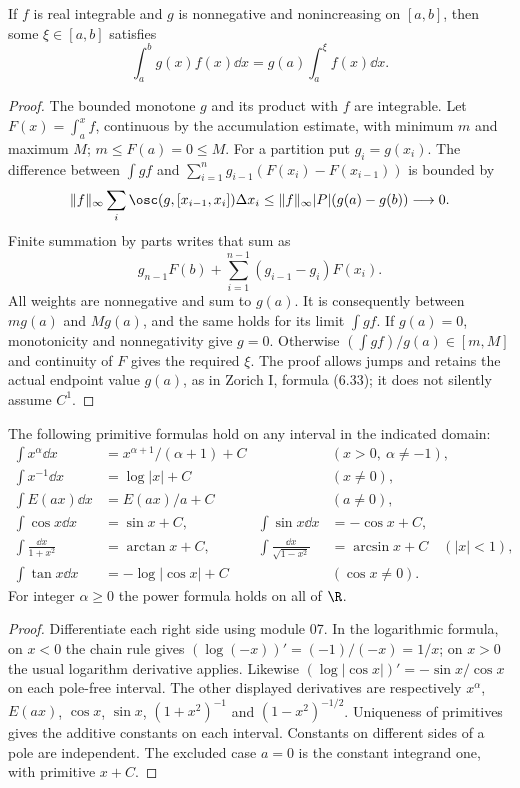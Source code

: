 \begin{theorem}
If $f$ is real integrable and $g$ is nonnegative and nonincreasing on
$[a,b]$, then some $\xi\in[a,b]$ satisfies
\[\int_a^bg(x)f(x)\dd x=g(a)\int_a^\xi f(x)\dd x.
\]
\end{theorem}
\begin{proof}
The bounded monotone $g$ and its product with $f$ are integrable.
Let $F(x)=\int_a^xf$, continuous by the accumulation estimate, with
minimum $m$ and maximum $M$; $m\le F(a)=0\le M$.
For a partition put $g_i=g(x_i)$. The difference between $\int gf$ and
$\sum_{i=1}^ng_{i-1}(F(x_i)-F(x_{i-1}))$ is bounded by
\[\|f\|_\infty\sum_i\osc(g,[x_{i-1},x_i])\Delta x_i
\le\|f\|_\infty |P|(g(a)-g(b))\longrightarrow0.
\]
Finite summation by parts writes that sum as
\[g_{n-1}F(b)+\sum_{i=1}^{n-1}(g_{i-1}-g_i)F(x_i).
\]
All weights are nonnegative and sum to $g(a)$. It is consequently
between $mg(a)$ and $Mg(a)$, and the same holds for its limit $\int gf$.
If $g(a)=0$, monotonicity and nonnegativity give $g=0$. Otherwise
$(\int gf)/g(a)\in[m,M]$ and continuity of $F$ gives the required
$\xi$. The proof allows jumps and retains the actual endpoint value
$g(a)$, as in Zorich I, formula (6.33); it does not silently assume $C^1$.
\end{proof}

\begin{proposition}
The following primitive formulas hold on any interval in the indicated domain:
\begin{align*}
\int x^\alpha\dd x&=x^{\alpha+1}/(\alpha+1)+C
 &&(x>0,\ \alpha\ne-1),\\
\int x^{-1}\dd x&=\log|x|+C&&(x\ne0),\\
\int E(ax)\dd x&=E(ax)/a+C&&(a\ne0),\\
\int\cos x\dd x&=\sin x+C,&
\int\sin x\dd x&=-\cos x+C,\\
\int\frac{\dd x}{1+x^2}&=\arctan x+C,&
\int\frac{\dd x}{\sqrt{1-x^2}}&=\arcsin x+C\quad(|x|<1),\\
\int\tan x\dd x&=-\log|\cos x|+C&&(\cos x\ne0).
\end{align*}
For integer $\alpha\ge0$ the power formula holds on all of $\R$.
\end{proposition}
\begin{proof}
Differentiate each right side using module 07. In the logarithmic formula,
on $x<0$ the chain rule gives $(\log(-x))'=(-1)/(-x)=1/x$;
on $x>0$ the usual logarithm derivative applies. Likewise
$(\log|\cos x|)'=-\sin x/\cos x$ on each pole-free interval.
The other displayed derivatives are respectively $x^\alpha$, $E(ax)$,
$\cos x$, $\sin x$, $(1+x^2)^{-1}$ and $(1-x^2)^{-1/2}$.
Uniqueness of primitives gives the additive constants on each interval.
Constants on different sides of a pole are independent. The excluded
case $a=0$ is the constant integrand one, with primitive $x+C$.
\end{proof}

